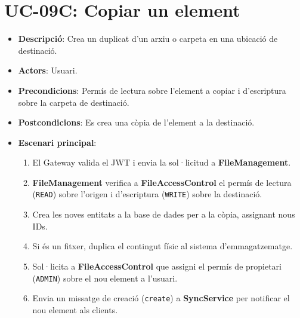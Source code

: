 \section{UC-09C: Copiar un element}
\begin{itemize}
    \item \textbf{Descripció}: Crea un duplicat d'un arxiu o carpeta en una ubicació de destinació.
    \item \textbf{Actors}: Usuari.
    \item \textbf{Precondicions}: Permís de lectura sobre l'element a copiar i d'escriptura sobre la carpeta de destinació.
    \item \textbf{Postcondicions}: Es crea una còpia de l'element a la destinació.
    \item \textbf{Escenari principal}:
    \begin{enumerate}
        \item El Gateway valida el JWT i envia la sol·licitud a \textbf{FileManagement}.
        \item \textbf{FileManagement} verifica a \textbf{FileAccessControl} el permís de lectura (\texttt{READ}) sobre l'origen i d'escriptura (\texttt{WRITE}) sobre la destinació.
        \item Crea les noves entitats a la base de dades per a la còpia, assignant nous IDs.
        \item Si és un fitxer, duplica el contingut físic al sistema d'emmagatzematge.
        \item Sol·licita a \textbf{FileAccessControl} que assigni el permís de propietari (\texttt{ADMIN}) sobre el nou element a l'usuari.
        \item Envia un missatge de creació (\texttt{create}) a \textbf{SyncService} per notificar el nou element als clients.
    \end{enumerate}
\end{itemize}

